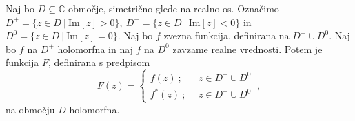 \documentclass[mat1, tisk]{fmfdelo}
\begin{document}
    \begin{trditev}
        Naj bo $D \subseteq \mathbb{C}$ območje, simetrično glede na realno os. 
        Označimo $D^{+} = \{z \in D~|~\text{Im}[z] > 0\},~D^{-} = \{z \in D~|~\text{Im}[z] < 0\}$ in $D^{0} = \{z \in D~|~\text{Im}[z] = 0\}$.
        Naj bo $f$ zvezna funkcija, definirana na $D^{+} \cup D^0$. Naj bo $f$ na $D^{+}$ holomorfna in naj $f$ na $D^0$ zavzame realne vrednosti.
        Potem je funkcija $F$, definirana s predpisom
        $$
        F(z) = 
        \begin{cases}
            f(z)~;~~&z \in D^{+} \cup D^0\\
            f^*(z)~;~~&z \in D^{-} \cup D^0
        \end{cases}~,
        $$
        na območju $D$ holomorfna.
    \end{trditev}
\end{document}
